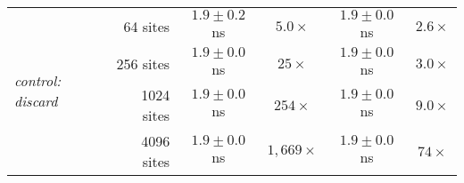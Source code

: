 \begin{table}[ht]
\begin{tabular}{l r cc cc}
\multirow{4}{*}{\textit{control: discard}}
 & 64 sites
   & \(1.9 \pm 0.2\) ns & \(5.0\times\)
   & \(1.9 \pm 0.0\) ns & \(2.6\times\) \\
 & 256 sites
   & \(1.9 \pm 0.0\) ns & \(25\times\)
   & \(1.9 \pm 0.0\) ns & \(3.0\times\) \\
 & 1024 sites
   & \(1.9 \pm 0.0\) ns & \(254\times\)
   & \(1.9 \pm 0.0\) ns & \(9.0\times\) \\
 & 4096 sites
   & \(1.9 \pm 0.0\) ns & \(1{,}669\times\)
   & \(1.9 \pm 0.0\) ns & \(74\times\) \\

\bottomrule
\end{tabular}
\end{table}
